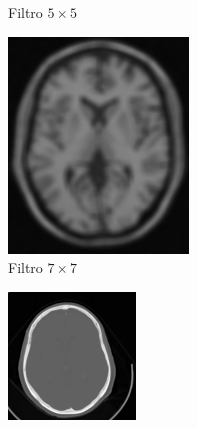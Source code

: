 \documentclass[letterpaper,12pt]{article}
\theoremstyle{plain}
\begin{document}
\begin{figure}[H]
\begin{subfigure}[h]{0.24\linewidth}
            \caption{\centering Filtro $5\times5$} 
         \end{subfigure}
         \begin{subfigure}[h]{0.24\linewidth}
            \centering
            \includegraphics[width=\textwidth]{Figuras/ImagenA7x7.png}
            \caption{\centering Filtro $7\times7$} 
         \end{subfigure}
         \begin{subfigure}[h]{0.24\linewidth}
            \centering
            \includegraphics[width=\textwidth]{Figuras/ImagenC.png}

\end{subfigure}
\end{figure}
\end{document}

